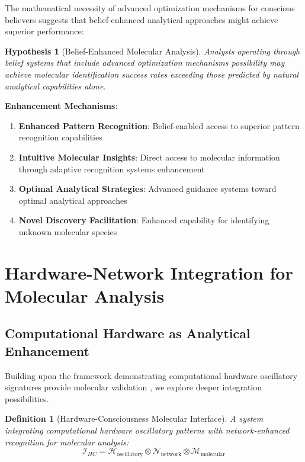\documentclass[11pt,a4paper]{article}
\newtheorem{definition}[theorem]{Definition}
\newtheorem{hypothesis}[theorem]{Hypothesis}
\theoremstyle{remark}
\begin{document}
The mathematical necessity of advanced optimization mechanisms for conscious believers suggests that belief-enhanced analytical approaches might achieve superior performance:

\begin{hypothesis}[Belief-Enhanced Molecular Analysis]
Analysts operating through belief systems that include advanced optimization mechanisms possibility may achieve molecular identification success rates exceeding those predicted by natural analytical capabilities alone.
\end{hypothesis}

\textbf{Enhancement Mechanisms}:
\begin{enumerate}
\item \textbf{Enhanced Pattern Recognition}: Belief-enabled access to superior pattern recognition capabilities
\item \textbf{Intuitive Molecular Insights}: Direct access to molecular information through adaptive recognition systems enhancement
\item \textbf{Optimal Analytical Strategies}: Advanced guidance systems toward optimal analytical approaches
\item \textbf{Novel Discovery Facilitation}: Enhanced capability for identifying unknown molecular species
\end{enumerate}

\section{Hardware-Network Integration for Molecular Analysis}

\subsection{Computational Hardware as Analytical Enhancement}

Building upon the framework demonstrating computational hardware oscillatory signatures provide molecular validation \cite{sachikonye2024oscillatory}, we explore deeper integration possibilities.

\begin{definition}[Hardware-Consciousness Molecular Interface]
A system integrating computational hardware oscillatory patterns with network-enhanced recognition for molecular analysis:
$$\mathcal{I}_{HC} = \mathcal{H}_{\text{oscillatory}} \otimes \mathcal{N}_{\text{network}} \otimes \mathcal{M}_{\text{molecular}}$$
\end{definition}
\end{document}
